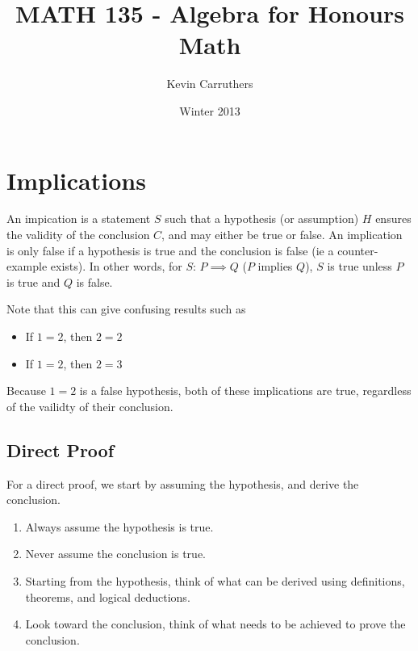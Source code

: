\documentclass[12pt]{article}
\begin{document}
\title{MATH 135 - Algebra for Honours Math}
\author{Kevin Carruthers}
\date{\vspace{-2ex}Winter 2013}
\maketitle\HRule

\section*{Implications}
 An impication is a statement $S$ such that a hypothesis (or assumption) $H$ ensures the validity of the conclusion $C$, and may either be true or false. An implication is only false if a hypothesis is true and the conclusion is false (ie a counter-example exists). In other words, for $S$: $P \implies Q$ ($P$ implies $Q$), $S$ is true unless $P$ is true and $Q$ is false.

Note that this can give confusing results such as
\begin{itemize}
\item If $1 = 2$, then $2 = 2$
\item If $1 = 2$, then $2 = 3$
\end{itemize}
Because $1 = 2$ is a false hypothesis, both of these implications are true, regardless of the vailidty of their conclusion.

\subsection*{Direct Proof}
For a direct proof, we start by assuming the hypothesis, and derive the conclusion.

\begin{enumerate}
\item Always assume the hypothesis is true.
\item Never assume the conclusion is true.
\item Starting from the hypothesis, think of what can be derived using definitions, theorems, and logical deductions.
\item Look toward the conclusion, think of what needs to be achieved to prove the conclusion.
\end{enumerate}


\end{document}
